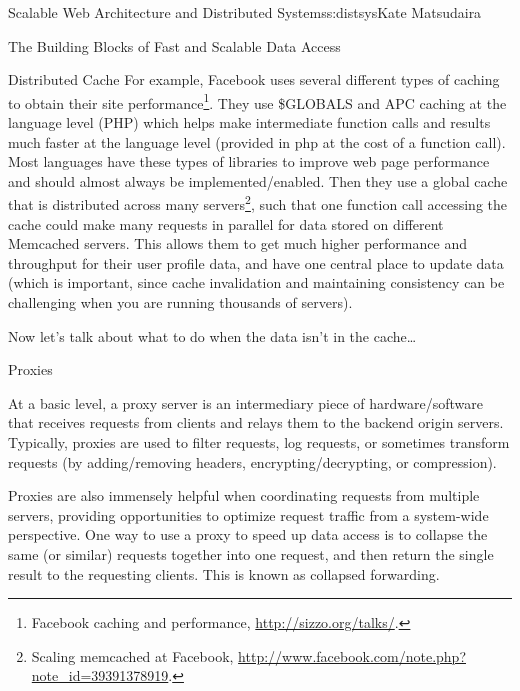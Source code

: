 \begin{aosachapter}{Scalable Web Architecture and Distributed Systems}{s:distsys}{Kate Matsudaira}
\begin{aosasect1}{The Building Blocks of Fast and Scalable Data Access}
\begin{aosasect2}{Distributed Cache}
For example, Facebook uses several different types of caching to
obtain their site performance\footnote{Facebook caching and
  performance, \url{http://sizzo.org/talks/}.}. They use \$GLOBALS and
APC caching at the language level (PHP) which helps make intermediate
function calls and results much faster at the language level (provided
in php at the cost of a function call). Most languages have these
types of libraries to improve web page performance and should almost
always be implemented/enabled. Then they use a global cache that is
distributed across many servers\footnote{Scaling memcached at
  Facebook,
  \url{http://www.facebook.com/note.php?note_id=39391378919}.}, such
that one function call accessing the cache could make many requests in
parallel for data stored on different Memcached servers. This allows
them to get much higher performance and throughput for their user
profile data, and have one central place to update data (which is
important, since cache invalidation and maintaining consistency can be
challenging when you are running thousands of servers).

Now let’s talk about what to do when the data isn’t in the cache{\ldots}

\end{aosasect2}

\begin{aosasect2}{Proxies}

At a basic level, a proxy server is an intermediary piece of
hardware/software that receives requests from clients and relays them
to the backend origin servers. Typically, proxies are used to filter
requests, log requests, or sometimes transform requests (by
adding/removing headers, encrypting/decrypting, or compression).


Proxies are also immensely helpful when coordinating requests from
multiple servers, providing opportunities to optimize request traffic
from a system-wide perspective. One way to use a proxy to speed up
data access is to collapse the same (or similar) requests together
into one request, and then return the single result to the requesting
clients. This is known as collapsed forwarding.


\end{aosasect2}
\end{aosasect1}
\end{aosachapter}
